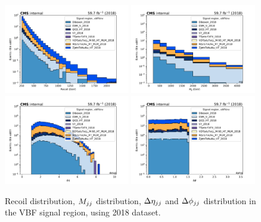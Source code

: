 \begin{figure}[htbp]
    \begin{center}
        \includegraphics[width=0.49\textwidth]{fig/datamc/sr_vbf/sr_vbf_recoil_losf_2018.pdf}
        \includegraphics[width=0.49\textwidth]{fig/datamc/sr_vbf/sr_vbf_mjj_losf_2018.pdf} \\
        \includegraphics[width=0.49\textwidth]{fig/datamc/sr_vbf/sr_vbf_detajj_losf_2018.pdf}
        \includegraphics[width=0.49\textwidth]{fig/datamc/sr_vbf/sr_vbf_dphijj_losf_2018.pdf}
    \end{center}
    \caption{Recoil distribution, $M_{jj}$ distribution, $\Delta \eta_{jj}$ and $\Delta \phi_{jj}$
    distribution in the VBF signal region, using 2018 dataset.}
    \label{fig:SR_pre_vbfhinv_2018}
\end{figure}

